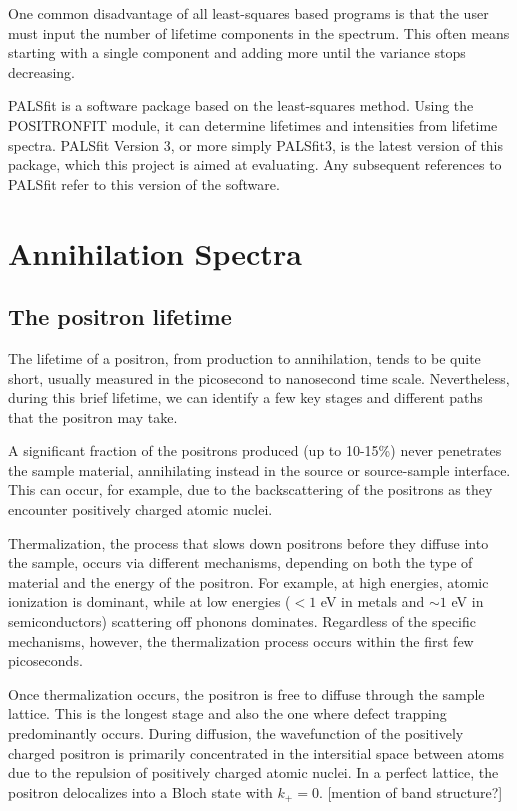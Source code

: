 One common disadvantage of all least-squares based programs is that the user must input the number of lifetime components in the spectrum. This often means starting with a single component and adding more until the variance stops decreasing.

PALSfit is a software package based on the least-squares method. Using the POSITRONFIT module, it can determine lifetimes and intensities from lifetime spectra. PALSfit Version 3, or more simply PALSfit3, is the latest version of this package, which this project is aimed at evaluating. Any subsequent references to PALSfit refer to this version of the software.

\chapter{Annihilation Spectra}

\section{The positron lifetime}

The lifetime of a positron, from production to annihilation, tends to be quite short, usually measured in the picosecond to nanosecond time scale. Nevertheless, during this brief lifetime, we can identify a few key stages and different paths that the positron may take. 

A significant fraction of the positrons produced (up to 10-15\%) never penetrates the sample material, annihilating instead in the source or source-sample interface. This can occur, for example, due to the backscattering of the positrons as they encounter positively charged atomic nuclei. 

Thermalization, the process that slows down positrons before they diffuse into the sample, occurs via different mechanisms, depending on both the type of material and the energy of the positron. For example, at high energies, atomic ionization is dominant, while at low energies ($<1$ eV in metals and $\sim1$ eV in semiconductors) scattering off phonons dominates. Regardless of the specific mechanisms, however, the thermalization process occurs within the first few picoseconds.

Once thermalization occurs, the positron is free to diffuse through the sample lattice. This is the longest stage and also the one where defect trapping predominantly occurs. During diffusion, the wavefunction of the positively charged positron is primarily concentrated in the intersitial space between atoms due to the repulsion of positively charged atomic nuclei. In a perfect lattice, the positron delocalizes into a Bloch state with $k_+ = 0$. [mention of band structure?]

